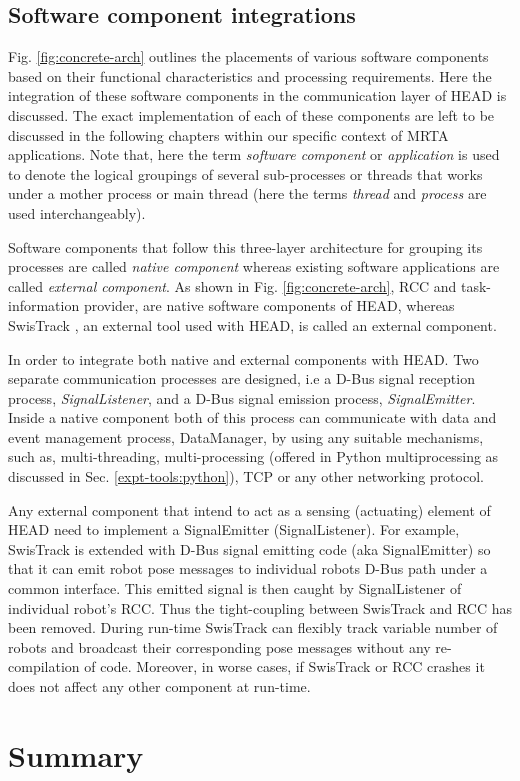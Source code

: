 \subsection{Software component integrations}
\label{expt-tools:arch:integration}
Fig. \ref{fig:concrete-arch} outlines the placements of various software components based on their functional characteristics and processing requirements. Here the integration of these software components in the communication layer of HEAD is discussed. The exact implementation of each of these components are left to be discussed in the following chapters within our specific context of MRTA applications. Note that, here  the term {\em software component} or {\em application} is used to denote the logical groupings of several sub-processes or threads that works under a mother process or main thread (here the terms \textit{thread} and \textit{process} are used interchangeably).

Software components that follow this three-layer architecture for grouping its processes are called {\em native component} whereas existing software applications are called {\em external component}. As shown in Fig. \ref{fig:concrete-arch}, RCC and task-information provider,   are native software components of HEAD, whereas SwisTrack \cite{Lochmatter+2008}, an external tool used with HEAD, is called an external component.

In order to integrate both native and external components with HEAD. Two separate communication processes are designed, i.e a D-Bus signal reception process, {\em SignalListener}, and a D-Bus signal emission process, {\em SignalEmitter}. Inside a native component both of this process can communicate with data and event management process, DataManager, by using any suitable mechanisms, such as, multi-threading, multi-processing (offered in Python multiprocessing as discussed in Sec. \ref{expt-tools:python}), TCP or any other networking protocol.

Any external component that intend to act as a sensing (actuating) element of HEAD need to implement a SignalEmitter (SignalListener). For example,  SwisTrack is extended with D-Bus signal emitting code (aka SignalEmitter) so that it can emit robot pose messages to individual robots D-Bus path under a common interface.  This emitted signal is then caught by SignalListener of individual robot's RCC. Thus the tight-coupling between SwisTrack and RCC has been removed. During run-time SwisTrack can flexibly track variable number of robots and broadcast their corresponding pose messages without any re-compilation of code. Moreover, in worse cases, if SwisTrack or RCC crashes it does not affect any other component at run-time.
\section{Summary}